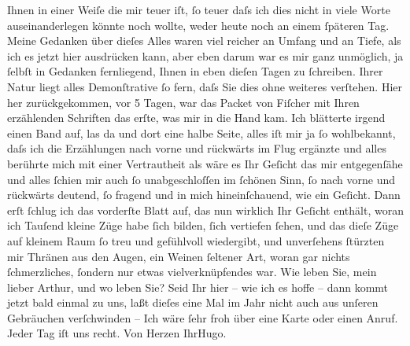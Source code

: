 \begin{ledgroupsized}[t]{13cm}
               Ihnen in einer Weiſe die mir teuer iſt, ſo teuer daſs ich dies nicht in viele Worte
               auseinanderlegen könnte noch wollte, weder heute noch an einem ſpäteren Tag.\pend
           \pstart
           Meine Gedanken über dieſes Alles waren viel reicher an Umfang und an Tiefe, als ich
               es jetzt hier ausdrücken kann, aber eben darum war es mir ganz {\pb}unmöglich, ja ſelbſt in Gedanken fernliegend, Ihnen in
               eben dieſen Tagen zu ſchreiben. Ihrer Natur liegt alles Demonſtrative ſo fern, daſs
               Sie dies ohne weiteres verſtehen.\pend
           \pstart
           Hier her zurückgekommen, vor 5 Tagen, war das Packet von Fiſcher mit Ihren erzählenden
                  Schriften das erſte, was mir in die Hand kam. Ich blätterte irgend einen Band
               auf, las da und dort eine halbe Seite, alles iſt mir ja ſo wohlbekannt, daſs ich die
               Erzählungen nach vorne und rückwärts im Flug ergänzte und alles berührte mich mit
               einer Vertrautheit als wäre es Ihr Geſicht das mir entgegenſähe und alles ſchien mir
               auch ſo unabgeschloſſen im ſchönen Sinn, ſo nach vorne und rückwärts deutend, ſo
               fragend und in mich hineinſchauend, wie ein Geſicht. Dann erſt ſchlug ich das
               vorderſte Blatt auf, das nun wirklich Ihr Geſicht enthält, woran ich Tauſend kleine Züge habe ſich
               bilden, ſich vertiefen ſehen, und das dieſe Züge auf kleinem Raum ſo treu und
               gefühlvoll wiedergibt, und unverſehens ſtürzten mir {\pb}Thränen aus den Augen, ein Weinen ſeltener Art, woran gar nichts ſchmerzliches,
               ſondern nur etwas vielverknüpfendes war.\pend
           \pstart
           Wie leben Sie, mein lieber Arthur, und wo leben Sie? Seid Ihr hier – wie ich es hoffe
               – dann kommt jetzt bald einmal zu uns, laßt dieſes eine Mal im Jahr nicht auch aus
               unſeren Gebräuchen verſchwinden – \pend
           \pstart
           Ich wäre ſehr froh über eine Karte oder einen Anruf. Jeder Tag iſt uns recht.\pend
           \pstart Von Herzen Ihr\spacefill\mbox{Hugo.}\pend{}
         
         \endnumbering{}\end{ledgroupsized}  \newcommand{\dateiname}{L02074}\newcommand{\titel}{Hugo von Hofmannsthal an Arthur Schnitzler, 12. 6. 1912}\newcommand{\editorInnen}{Martin Anton Müller und Gerd-Hermann Susen}
      